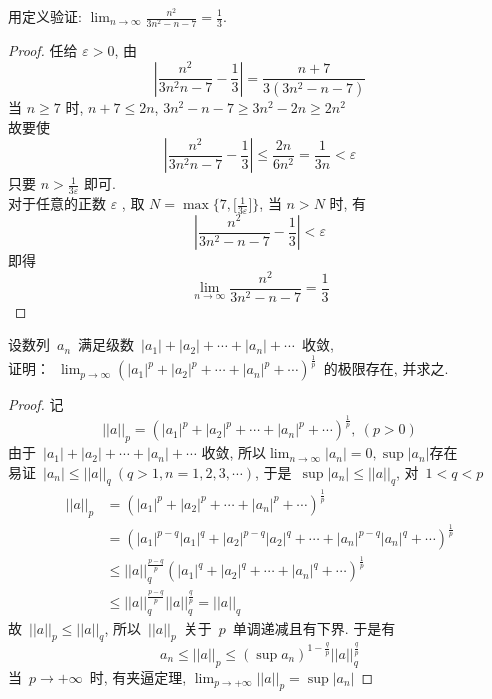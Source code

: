 \documentclass[color=green,titlestyle=hang]{elegantbook}%
\begin{document}
\begin{example}
用定义验证: $\lim_{n\to\infty}\frac{n^2}{3n^2-n-7}=\frac{1}{3}$. 
\end{example}\begin{proof}
任给 $\varepsilon>0$, 由	
\[\left|\frac{n^2}{3n^2n-7}-\frac{1}{3}\right|=\frac{n+7}{3(3n^2-n-7)}\]
{\color{blue}当 $n\geqslant7$ 时}, $n+7\leqslant2n$, $3n^2-n-7\geqslant3n^2-2n\geqslant 2n^2$\\
故要使\[\left|\frac{n^2}{3n^2n-7}-\frac{1}{3}\right|\leqslant\frac{2n}{6n^2}=\frac{1}{3n}<\varepsilon\]
只要 $n>\frac{1}{3\varepsilon}$ 即可.\\
对于任意的正数 $\varepsilon$ , 取 {\color{blue}$N=\max\Big\{7,\big[\tfrac{1}{3\varepsilon}\big]\Big\}$}, 当 $n>N$ 时, 有\[\left|\frac{n^2}{3n^2-n-7}-\frac{1}{3}\right|<\varepsilon\]
即得\[\lim_{n\to\infty}\frac{n^2}{3n^2-n-7}=\frac{1}{3}\]
\end{proof}

\begin{example}
设数列~$a_n$~满足级数~$|a_1|+|a_2|+\cdots+|a_n|+\cdots$~收敛,\\ 证明：~$\displaystyle\lim_{p\to\infty}(|a_1|^p+|a_2|^p+\cdots+|a_n|^p+\cdots)^{\frac{1}{p}}$~的极限存在, 并求之.
\end{example}\begin{proof}
记\[||a||_p=\left(|a_1|^p+|a_2|^p+\cdots+|a_n|^p+\cdots\right)^{\frac{1}{p}}, ~(p>0)\]
由于~$|a_1|+|a_2|+\cdots+|a_n|+\cdots$ 收敛, 所以$\displaystyle\lim_{n\to\infty}|a_n|=0, \sup|a_n|$存在\\
易证~$|a_n|\leq ||a||_q~(q>1, n=1,2,3,\cdots)$, 于是~$\sup |a_n|\leq ||a||_q$, 对~$1<q<p$
\begin{align*}
||a||_p&=(|a_1|^p+|a_2|^p+\cdots+|a_n|^p+\cdots)^{\frac{1}{p}}\\
&=  (|a_1|^{p-q}|a_1|^q+|a_2|^{p-q}|a_2|^q+\cdots+|a_n|^{p-q}|a_n|^q+\cdots)^{\frac{1}{p}}\\
&\leq ||a||_q^{\frac{p-q}{p}}(|a_1|^q+|a_2|^q+\cdots+|a_n|^q+\cdots)^{\frac{1}{p}}\\
&\leq ||a||_q^{\frac{p-q}{p}}||a||_q^{\frac{q}{p}}=||a||_q
\end{align*}
故~$||a||_p \leq ||a||_q$, 所以~$||a||_p$~关于~$p$~单调递减且有下界.
于是有
\[a_n\leq ||a||_p\leq (\sup a_n)^{1-\frac{q}{p}}||a||_q^{\frac{q}{p}}\]
当~$p\to+\infty$~时, 有夹逼定理, $\displaystyle\lim_{p\to+\infty}||a||_p=\sup |a_n|$	
\end{proof}
\end{document}
